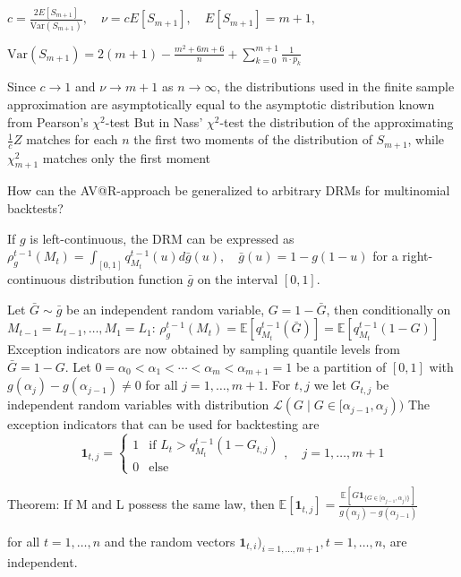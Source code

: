 \(
c = \frac{2E[S_{m+1}]}{\text{Var}(S_{m+1})}, \quad \nu = cE[S_{m+1}], \quad E[S_{m+1}] = m+1,
\)

\(
\text{Var}(S_{m+1}) = 2(m+1) - \frac{m^2 + 6m + 6}{n} + \sum_{k=0}^{m+1} \frac{1}{n \cdot p_k}
\)

Since \(c \to 1\) and \(\nu \to m+1\) as \(n \to \infty\), the distributions used in the finite sample approximation are asymptotically equal to the asymptotic distribution 
known from Pearson’s \(\chi^2\)-test
But in Nass' \(\chi^2\)-test the distribution of the approximating \(\frac{1}{c}Z\) matches for each \(n\) the first two moments of the distribution 
of \(S_{m+1}\), while \(\chi^2_{m+1}\) matches only the first moment


How can the AV@R-approach be generalized to arbitrary DRMs for multinomial backtests?

If \(g\) is left-continuous, the DRM can be expressed as
\(
\rho_g^{t-1}(M_t) = \int_{[0,1]} q_{M_t}^{t-1}(u) d\bar{g}(u), \quad \bar{g}(u) = 1 - g(1-u)
\)
for a right-continuous distribution function \(\bar{g}\) on the interval \([0, 1]\).

Let \(\bar{G} \sim \bar{g}\) be an independent random variable, \(G = 1 - \bar{G}\), then conditionally on \(M_{t-1} = L_{t-1}, \ldots, M_1 = L_1\):
\(
\rho_g^{t-1}(M_t) = \mathbb{E} \left[ q_{M_t}^{t-1}(\bar{G}) \right] = \mathbb{E} \left[ q_{M_t}^{t-1}(1 - G) \right]
\)
Exception indicators are now obtained by sampling quantile levels from \(\bar{G} = 1 - G\).
Let \(0 = \alpha_0 < \alpha_1 < \cdots < \alpha_m < \alpha_{m+1} = 1\) be a partition of \( [0,1] \) with \( g(\alpha_j) - g(\alpha_{j-1}) \neq 0 \) 
for all \( j = 1, \ldots, m+1 \).
For \( t, j \) we let \( G_{t,j} \) be independent random variables with distribution \( \mathcal{L}(G \mid G \in [\alpha_{j-1}, \alpha_j)) \)
The exception indicators that can be used for backtesting are
\[
\mathbf{1}_{t,j} = 
\begin{cases} 
1 & \text{if } L_t > q_{M_t}^{t-1}(1 - G_{t,j}) \\
0 & \text{else} 
\end{cases}
, \quad j = 1, \ldots, m+1
\]

Theorem:
If M and L possess the same law, then
\(
\mathbb{E}[\mathbf{1}_{t,j}] = \frac{\mathbb{E}\left[G \mathbf{1}_{\{G \in [\alpha_{j-1}, \alpha_j)\}}\right]}{g(\alpha_j) - g(\alpha_{j-1})}
\)

for all \( t = 1, \ldots, n \) and the random vectors \(\mathbf{1}_{t,i})_{i=1,...,m+1}, t = 1, \ldots, n\), are independent.

